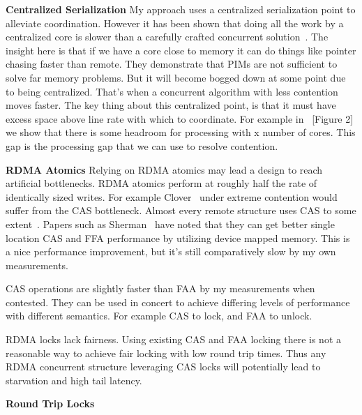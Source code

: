 \textbf{Centralized Serialization} My approach uses a centralized serialization
point to alleviate coordination. However it has been shown that doing all the
work by a centralized core is slower than a carefully crafted concurrent
solution~\cite{near-memory-structs}. The insight here is that if we have a core
close to memory it can do things like pointer chasing faster than remote. They
demonstrate that PIMs are not sufficient to solve far memory problems. But it
will become bogged down at some point due to being centralized. That's when a
concurrent algorithm with less contention moves faster. The key thing about this
centralized point, is that it must have excess space above line rate with which
to coordinate. For example in ~\cite{fairnic}[Figure 2] we show that there is
some headroom for processing with x number of cores. This gap is the processing
gap that we can use to resolve contention.

\textbf{RDMA Atomics} Relying on RDMA atomics may lead a design to reach
artificial bottlenecks. RDMA atomics perform at roughly half the rate of
identically sized writes. For example Clover~\cite{clover} under extreme
contention would suffer from the CAS bottleneck. Almost every remote structure
uses CAS to some extent~. Papers such as
Sherman~\cite{sherman} have noted that they can get better single location CAS
and FFA performance by utilizing device mapped memory. This is a nice
performance improvement, but it's still comparatively slow by my own
measurements.

CAS operations are slightly faster than FAA by my measurements when contested.
They can be used in concert to achieve differing levels of performance with
different semantics. For example CAS to lock, and FAA to unlock.

RDMA locks lack fairness. Using existing CAS and FAA locking there is not a
reasonable way to achieve fair locking with low round trip times. Thus any RDMA
concurrent structure leveraging CAS locks will potentially lead to starvation
and high tail latency.

\textbf{Round Trip Locks}

